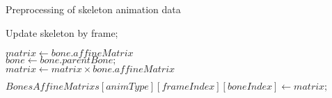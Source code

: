 \documentclass[11pt]{ctexart}
\begin{document}
  
	
	\begin{algorithm}  
		\caption{Preprocessing of skeleton animation data}  
		\LinesNumbered  
		
		{
			Update skeleton by frame;\\
			{
				$matrix \gets bone.affineMatrix$ \\
				{
					$bone \gets bone.parentBone;$\\
					$matrix \gets matrix \times bone.affineMatrix$
				}  
			
				$BonesAffineMatrixs[animType][frameIndex][boneIndex] \gets matrix;$
			} 
		}  
	
		{}
		
		
	\end{algorithm}  
\end{document}

